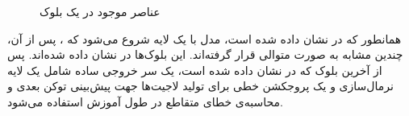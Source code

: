 \begin{figure}%
      \centering
      \qquad
      \caption{عناصر موجود در یک بلوک }
      \label{fig:RWKVBocks}
\end{figure}

همانطور که در  نشان داده شده است،
مدل با یک لایه  شروع می‌شود که ، پس از آن، چندین   مشابه به صورت متوالی قرار گرفته‌اند. این بلوک‌ها در  نشان داده شده‌اند. پس از آخرین بلوک که در  نشان داده شده است، یک سر خروجی ساده شامل یک لایه نرمال‌سازی  و یک پروجکشن خطی برای تولید لاجیت‌ها  جهت پیش‌بینی توکن بعدی و محاسبه‌ی خطای متقاطع  در طول آموزش استفاده می‌شود.

